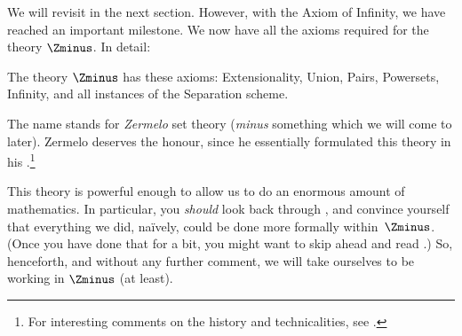 \documentclass[../../../include/open-logic-section]{subfiles}
\begin{document}

We will revisit \stagesinf{} in the next section. However, with the
Axiom of Infinity, we have reached an important milestone. We now have
all the axioms required for the theory $\Zminus$. In detail:

\begin{defn}
The theory $\Zminus$ has these axioms: Extensionality, Union, Pairs, Powersets, Infinity, and all instances of the Separation scheme.
\end{defn}

The name stands for \emph{Zermelo} set theory (\emph{minus} something
which we will come to later). Zermelo deserves the honour, since he
essentially formulated this theory in his
\cite{Zermelo1908Untersuchungen}.\footnote{For interesting
comments on the history and technicalities, see \cite[Appendix
A]{Potter2004}.}

This theory is powerful enough to allow us to do an enormous amount of
mathematics. In particular, you \emph{should} look back through
, and convince yourself that everything we did,
na\"ively, could be done more formally within~$\Zminus$. (Once you
have done that for a bit, you might want to skip ahead and read
.) So, henceforth,
and without any further comment, we will take ourselves to be working
in $\Zminus$ (at least).
\end{document}

